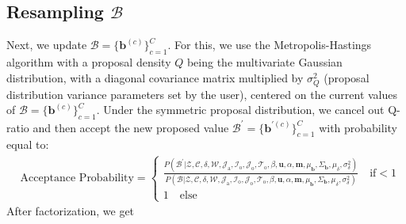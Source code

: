 \documentclass[a4paper]{article}
\begin{document}
 \subsection{Resampling $\mathcal{B}$ }  \label{subsec: Resampling B}
Next, we update $\mathcal{B}=\{\boldsymbol{b}^{(c)}\}_{c=1}^C$. For this, we use the Metropolis-Hastings algorithm with a proposal density $Q$ being the multivariate Gaussian distribution, with a diagonal covariance matrix multiplied by $\sigma^2_Q$ (proposal distribution variance parameters set by the user), centered on the current values of $\mathcal{B}=\{\boldsymbol{b}^{(c)}\}_{c=1}^C$. Under the symmetric proposal distribution, we cancel out Q-ratio and then accept the new proposed value $\mathcal{B}^\prime=\{\boldsymbol{b}^{\prime(c)}\}_{c=1}^C$ with probability equal to:
 \begin{equation}
 \begin{split}
 & \mbox{Acceptance Probability}=
 \begin{cases}  \frac{P(\mathcal{B}^\prime|\mathcal{Z},   \mathcal{C}, \delta, \mathcal{W},  \mathcal{J}_{\mbox{a}}, \mathcal{I}_{\mbox{o}}, \mathcal{J}_{\mbox{o}}, \mathcal{T}_{\mbox{o}}, \beta, \boldsymbol{u}, \alpha, \boldsymbol{m},\mu_{\boldsymbol{b}}, \Sigma_{\boldsymbol{b}}, \mu_\delta, \sigma^2_\delta)}{P(\mathcal{B}|\mathcal{Z},   \mathcal{C}, \delta, \mathcal{W}, \mathcal{J}_{\mbox{a}}, \mathcal{I}_{\mbox{o}}, \mathcal{J}_{\mbox{o}}, \mathcal{T}_{\mbox{o}}, \beta, \boldsymbol{u}, \alpha, \boldsymbol{m}, \mu_{\boldsymbol{b}}, \Sigma_{\boldsymbol{b}}, \mu_\delta, \sigma^2_\delta)}\quad\text{if}  <1\\
 1 \quad \text{else}
 \end{cases}
 \end{split}
 \end{equation}
 After factorization, we get
\end{document}
